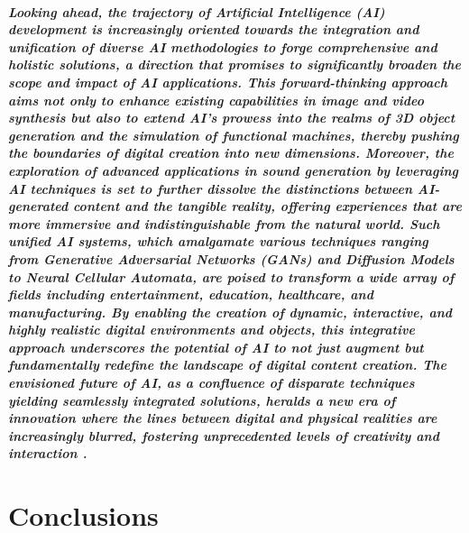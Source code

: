 \documentclass[11pt,a4paper,oneside]{report}
\begin{document}
\paragraph{Looking ahead, the trajectory of Artificial Intelligence (AI) development is increasingly oriented towards the integration and unification of diverse AI methodologies to forge comprehensive and holistic solutions, a direction that promises to significantly broaden the scope and impact of AI applications. This forward-thinking approach aims not only to enhance existing capabilities in image and video synthesis but also to extend AI's prowess into the realms of 3D object generation and the simulation of functional machines, thereby pushing the boundaries of digital creation into new dimensions. Moreover, the exploration of advanced applications in sound generation by leveraging AI techniques is set to further dissolve the distinctions between AI-generated content and the tangible reality, offering experiences that are more immersive and indistinguishable from the natural world. Such unified AI systems, which amalgamate various techniques ranging from Generative Adversarial Networks (GANs) and Diffusion Models to Neural Cellular Automata, are poised to transform a wide array of fields including entertainment, education, healthcare, and manufacturing. By enabling the creation of dynamic, interactive, and highly realistic digital environments and objects, this integrative approach underscores the potential of AI to not just augment but fundamentally redefine the landscape of digital content creation. The envisioned future of AI, as a confluence of disparate techniques yielding seamlessly integrated solutions, heralds a new era of innovation where the lines between digital and physical realities are increasingly blurred, fostering unprecedented levels of creativity and interaction \cite{esser2022towards}.}




\chapter{Conclusions}
\label{conclusions}
\end{document}

